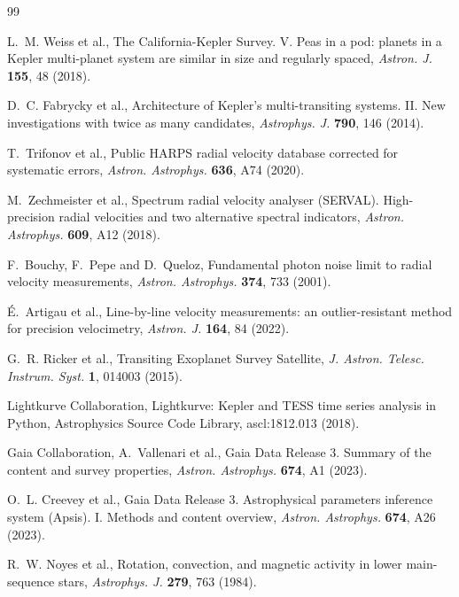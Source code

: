 \documentclass[3p,11pt]{elsarticle}
\begin{document}
\begin{thebibliography}{99}\small\raggedright
\setlength{\itemsep}{1pt}

L.~M. Weiss et al., The California-Kepler Survey. V. Peas in a pod: planets in a Kepler multi-planet
system are similar in size and regularly spaced, \emph{Astron. J.} \textbf{155}, 48 (2018).

D.~C. Fabrycky et al., Architecture of Kepler's multi-transiting systems. II. New investigations with
twice as many candidates, \emph{Astrophys. J.} \textbf{790}, 146 (2014).

T.~Trifonov et al., Public HARPS radial velocity database corrected for systematic errors,
\emph{Astron. Astrophys.} \textbf{636}, A74 (2020).

M.~Zechmeister et al., Spectrum radial velocity analyser (SERVAL). High-precision radial velocities and
two alternative spectral indicators, \emph{Astron. Astrophys.} \textbf{609}, A12 (2018).

F.~Bouchy, F.~Pepe and D.~Queloz, Fundamental photon noise limit to radial velocity measurements,
\emph{Astron. Astrophys.} \textbf{374}, 733 (2001).

\'E.~Artigau et al., Line-by-line velocity measurements: an outlier-resistant method for precision
velocimetry, \emph{Astron. J.} \textbf{164}, 84 (2022).

G.~R. Ricker et al., Transiting Exoplanet Survey Satellite, \emph{J. Astron. Telesc. Instrum. Syst.}
\textbf{1}, 014003 (2015).

Lightkurve Collaboration, Lightkurve: Kepler and TESS time series analysis in Python, Astrophysics
Source Code Library, ascl:1812.013 (2018).

Gaia Collaboration, A.~Vallenari et al., Gaia Data Release 3. Summary of the content and survey
properties, \emph{Astron. Astrophys.} \textbf{674}, A1 (2023).

O.~L. Creevey et al., Gaia Data Release 3. Astrophysical parameters inference system (Apsis). I. Methods
and content overview, \emph{Astron. Astrophys.} \textbf{674}, A26 (2023).

R.~W. Noyes et al., Rotation, convection, and magnetic activity in lower main-sequence stars,
\emph{Astrophys. J.} \textbf{279}, 763 (1984).


\end{thebibliography}
\end{document}
